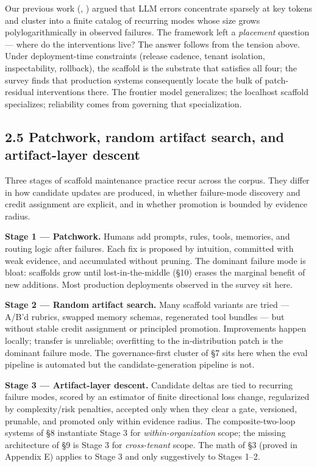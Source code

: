 \documentclass[
]{article}
\begin{document}
Our previous work (, ) argued that LLM
errors concentrate sparsely at key tokens and cluster into a finite
catalog of recurring modes whose size grows polylogarithmically in
observed failures. The framework left a \emph{placement} question ---
where do the interventions live? The answer follows from the tension
above. Under deployment-time constraints (release cadence, tenant
isolation, inspectability, rollback), the scaffold is the substrate that
satisfies all four; the survey finds that production systems
consequently locate the bulk of patch-residual interventions there. The
frontier model generalizes; the localhost scaffold specializes;
reliability comes from governing that specialization.

\subsection{2.5 Patchwork, random artifact search, and artifact-layer
descent}\label{patchwork-random-artifact-search-and-artifact-layer-descent}

Three stages of scaffold maintenance practice recur across the corpus.
They differ in how candidate updates are produced, in whether
failure-mode discovery and credit assignment are explicit, and in
whether promotion is bounded by evidence radius.

\textbf{Stage 1 --- Patchwork.} Humans add prompts, rules, tools,
memories, and routing logic after failures. Each fix is proposed by
intuition, committed with weak evidence, and accumulated without
pruning. The dominant failure mode is bloat: scaffolds grow until
lost-in-the-middle (§10) erases the marginal benefit of new additions.
Most production deployments observed in the survey sit here.

\textbf{Stage 2 --- Random artifact search.} Many scaffold variants are
tried --- A/B'd rubrics, swapped memory schemas, regenerated tool
bundles --- but without stable credit assignment or principled
promotion. Improvements happen locally; transfer is unreliable;
overfitting to the in-distribution patch is the dominant failure mode.
The governance-first cluster of §7 sits here when the eval pipeline is
automated but the candidate-generation pipeline is not.

\textbf{Stage 3 --- Artifact-layer descent.} Candidate deltas are tied
to recurring failure modes, scored by an estimator of finite directional
loss change, regularized by complexity/risk penalties, accepted only
when they clear a gate, versioned, prunable, and promoted only within
evidence radius. The composite-two-loop systems of §8 instantiate Stage
3 for \emph{within-organization} scope; the missing architecture of §9
is Stage 3 for \emph{cross-tenant} scope. The math of §3 (proved in
Appendix E) applies to Stage 3 and only suggestively to Stages 1--2.
\end{document}
